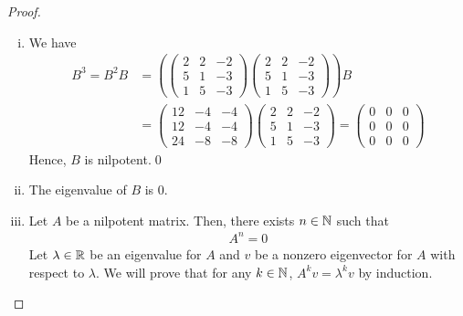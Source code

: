 \begin{proof}
    \renewcommand{\qedsymbol}{$\blacksquare$}
    \begin{enumerate}[(i)]
        \item We have 
        \[
            \begin{aligned}
                B^3=B^2B
                &=\left(\begin{pmatrix}
                    2 & 2 & -2\\
                    5 & 1 & -3\\
                    1 & 5 & -3
                \end{pmatrix}\begin{pmatrix}
                    2 & 2 & -2\\
                    5 & 1 & -3\\
                    1 & 5 & -3
                \end{pmatrix}\right)B\\
                &=\begin{pmatrix}
                    12 & -4 & -4\\
                    12 & -4 & -4\\
                    24 & -8 & -8
                \end{pmatrix}\begin{pmatrix}
                    2 & 2 & -2\\
                    5 & 1 & -3\\
                    1 & 5 & -3
                \end{pmatrix}=\begin{pmatrix}
                    0 & 0 & 0\\
                    0 & 0 & 0\\
                    0 & 0 & 0
                \end{pmatrix}
            \end{aligned}
        \]
        Hence, $B$ is nilpotent.\qed
        \item The eigenvalue of $B$ is 0.
        \item Let $A$ be a nilpotent matrix. Then, there exists $n\in\mathbb N$ such that 
        \[
            \begin{aligned}
                A^n=0
            \end{aligned}
        \]
        Let $\lambda\in\mathbb R$ be an eigenvalue for $A$ and $v$ be a nonzero eigenvector for $A$ with respect to $\lambda$.
        We will prove that for any $k\in\mathbb N$, $A^kv=\lambda^kv$ by induction.


\end{enumerate}
\end{proof}
